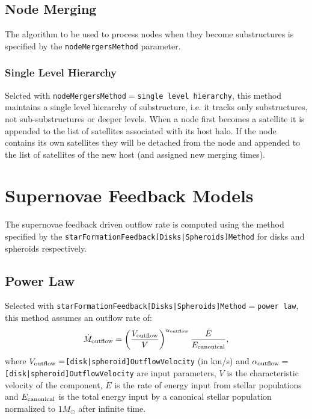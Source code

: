 \subsection{Node Merging}

The algorithm to be used to process nodes when they become substructures is specified by the {\tt nodeMergersMethod} parameter.

\subsubsection{Single Level Hierarchy}

Selcted with {\tt nodeMergersMethod}$=${\tt single level hierarchy}, this method maintains a single level hierarchy of substructure, i.e. it tracks only substructures, not sub-substructures or deeper levels. When a node first becomes a satellite it is appended to the list of satellites associated with its host halo. If the node contains its own satellites they will be detached from the node and appended to the list of satellites of the new host (and assigned new merging times).

\section{Supernovae Feedback Models}\label{sec:sneFeedback}

The supernovae feedback driven outflow rate is computed using the method specified by the {\tt starFormationFeedback[Disks|Spheroids]Method} for disks and spheroids respectively.

\subsection{Power Law}

Selected with {\tt starFormationFeedback[Disks|Spheroids]Method}$=${\tt power law}, this method assumes an outflow rate of:
\begin{equation}
 \dot{M}_{\rm outflow} = \left({V_{\rm outflow} \over V}\right)^{\alpha_{\rm outflow}} {\dot{E} \over E_{\rm canonical}},
\end{equation}
where $V_{\rm outflow}=${\tt [disk|spheroid]OutflowVelocity} (in km/s) and $\alpha_{\rm outflow}=${\tt [disk|spheroid]OutflowVelocity} are input parameters, $V$ is the characteristic velocity of the component, $\dot{E}$ is the rate of energy input from stellar populations and $E_{\rm canonical}$ is the total energy input by a canonical stellar population normalized to $1 M_\odot$ after infinite time.

